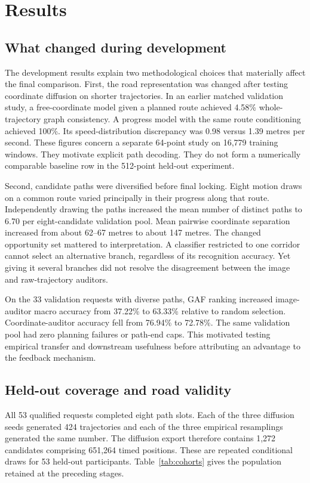 \chapter{Results}
\label{ch:results}
\section{What changed during development}
The development results explain two methodological choices that materially affect the final comparison. First, the road representation was changed after testing coordinate diffusion on shorter trajectories. In an earlier matched validation study, a free-coordinate model given a planned route achieved 4.58\% whole-trajectory graph consistency. A progress model with the same route conditioning achieved 100\%. Its speed-distribution discrepancy was 0.98 versus 1.39 metres per second. These figures concern a separate 64-point study on 16,779 training windows. They motivate explicit path decoding. They do not form a numerically comparable baseline row in the 512-point held-out experiment.

Second, candidate paths were diversified before final locking. Eight motion draws on a common route varied principally in their progress along that route. Independently drawing the paths increased the mean number of distinct paths to 6.70 per eight-candidate validation pool. Mean pairwise coordinate separation increased from about 62--67 metres to about 147 metres. The changed opportunity set mattered to interpretation. A classifier restricted to one corridor cannot select an alternative branch, regardless of its recognition accuracy. Yet giving it several branches did not resolve the disagreement between the image and raw-trajectory auditors.

On the 33 validation requests with diverse paths, GAF ranking increased image-auditor macro accuracy from 37.22\% to 63.33\% relative to random selection. Coordinate-auditor accuracy fell from 76.94\% to 72.78\%. The same validation pool had zero planning failures or path-end caps. This motivated testing empirical transfer and downstream usefulness before attributing an advantage to the feedback mechanism.

\section{Held-out coverage and road validity}
All 53 qualified requests completed eight path slots. Each of the three diffusion seeds generated 424 trajectories and each of the three empirical resamplings generated the same number. The diffusion export therefore contains 1,272 candidates comprising 651,264 timed positions. These are repeated conditional draws for 53 held-out participants. Table~\ref{tab:cohorts} gives the population retained at the preceding stages.

